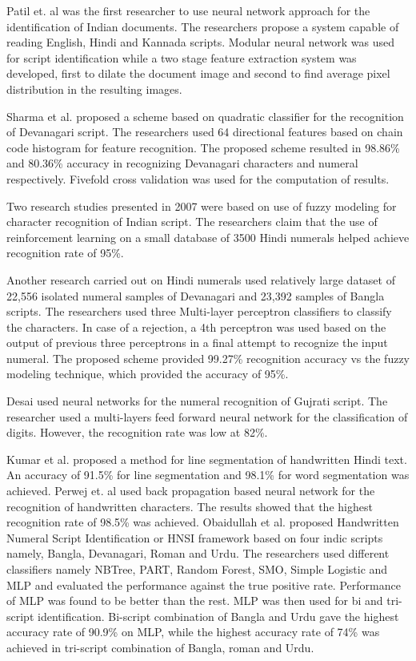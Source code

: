 \documentclass{article}
\begin{document}
Patil et. al \cite{patil2002neural} was the first researcher to use neural network approach for the identification of Indian documents. The researchers propose a system capable of reading English, Hindi and Kannada scripts. Modular neural network was used for script identification while a two stage feature extraction system was developed, first to dilate the document image and second to find average pixel distribution in the resulting images. 

Sharma et al. \cite{sharma2006recognition} proposed a scheme based on quadratic classifier for the recognition of Devanagari script. The researchers used 64 directional features based on chain code histogram \cite{cch} for feature recognition. The proposed scheme resulted in 98.86\% and 80.36\% accuracy in recognizing Devanagari characters and numeral respectively. Fivefold cross validation was used for the computation of results.

Two research studies \cite{hanmandlu2007fuzzy,hanmandlu2007input} presented in 2007 were based on use of fuzzy modeling for character recognition of Indian script. The researchers claim that the use of reinforcement learning on a small database of 3500 Hindi numerals helped achieve recognition rate of 95\%.

Another research carried out on Hindi numerals \cite{bhattacharya2009handwritten} used relatively large dataset of 22,556 isolated numeral samples of Devanagari and 23,392 samples of Bangla scripts. The researchers used three Multi-layer perceptron classifiers to classify the characters. In case of a rejection, a 4th perceptron was used based on the output of previous three perceptrons in a final attempt to recognize the input numeral.  The proposed scheme provided 99.27\% recognition accuracy vs the fuzzy modeling technique, which provided the accuracy of 95\%. 


Desai \cite{desai2010gujarati} used neural networks for the numeral recognition of Gujrati script. The researcher used a multi-layers feed forward neural network for the classification of digits. However, the recognition rate was low at 82\%. 

Kumar et al. \cite{garg2010s,garg2010new} proposed a method for line segmentation of handwritten Hindi text. An accuracy of 91.5\% for line segmentation and 98.1\% for word segmentation was achieved. Perwej et. al \cite{perwej2012machine} used back propagation based neural network for the recognition of handwritten characters. The results showed that the highest recognition rate of 98.5\% was achieved. Obaidullah et al. \cite{obaidullah2015numeral} proposed Handwritten Numeral Script Identification or HNSI framework based on four indic scripts namely, Bangla, Devanagari, Roman and Urdu. The researchers used  different classifiers namely NBTree, PART, Random Forest, SMO, Simple Logistic and MLP and evaluated the performance against the true positive rate. Performance of MLP was found to be better than the rest. MLP was then used for bi and tri-script identification. Bi-script combination of Bangla and Urdu gave the highest accuracy rate of 90.9\% on MLP, while the highest accuracy rate of 74\% was achieved in tri-script combination of Bangla, roman and Urdu. 
\end{document}
